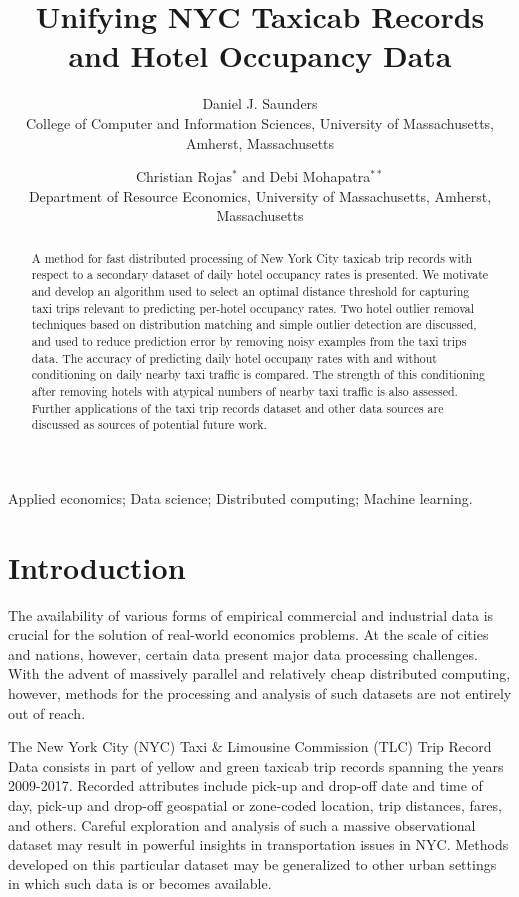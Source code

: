 \documentclass[useAMS, usenatbib]{biom}
\title{Unifying NYC Taxicab Records and Hotel Occupancy Data}
\author
{Daniel J. Saunders \emailx{djsaunde@cs.umass.edu} \\
College of Computer and Information Sciences, University of Massachusetts, Amherst, Massachusetts
\and
Christian Rojas$^{*}$\email{rojas@resecon.umass.edu} and
Debi Mohapatra$^{**}$\email{dmohapatra@umass.edu} \\
Department of Resource Economics, University of Massachusetts, 
Amherst, Massachusetts}
\begin{document}
\label{firstpage}

\begin{abstract}
A method for fast distributed processing of New York City taxicab trip records with respect to a secondary dataset of daily hotel occupancy rates is presented. We motivate and develop an algorithm used to select an optimal distance threshold for capturing taxi trips relevant to predicting per-hotel occupancy rates. Two hotel outlier removal techniques based on distribution matching and simple outlier detection are discussed, and used to reduce prediction error by removing noisy examples from the taxi trips data. The accuracy of predicting daily hotel occupany rates with and without conditioning on daily nearby taxi traffic is compared. The strength of this conditioning after removing hotels with atypical numbers of nearby taxi traffic is also assessed. Further applications of the taxi trip records dataset and other data sources are discussed as sources of potential future work.
\end{abstract}

\begin{keywords}
Applied economics; Data science; Distributed computing; Machine learning.
\end{keywords}

\maketitle

\section{Introduction}
\label{s:intro}

The availability of various forms of empirical commercial and industrial data is crucial for the solution of real-world economics problems. At the scale of cities and nations, however, certain data present major data processing challenges. With the advent of massively parallel and relatively cheap distributed computing, however, methods for the processing and analysis of such datasets are not entirely out of reach.

The New York City (NYC) Taxi \& Limousine Commission (TLC) Trip Record Data consists in part of yellow and green taxicab trip records spanning the years 2009-2017. Recorded attributes include pick-up and drop-off date and time of day, pick-up and drop-off geospatial or zone-coded location, trip distances, fares, and others. Careful exploration and analysis of such a massive observational dataset may result in powerful insights in transportation issues in NYC. Methods developed on this particular dataset may be generalized to other urban settings in which such data is or becomes available.
\end{document}
